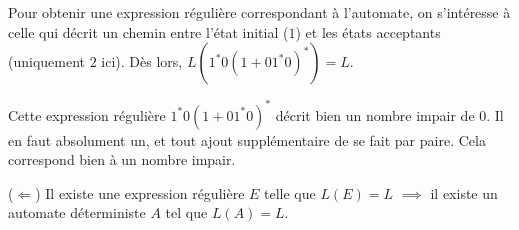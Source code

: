 \begin{exemple}
	Pour obtenir une expression régulière correspondant à l'automate, on s'intéresse à celle qui décrit un chemin entre l'état initial ($1$) et les états acceptants (uniquement $2$ ici). Dès lors,  $L(1^*0(1+01^*0)^*)=L$.
	
	Cette expression régulière $1^*0(1+01^*0)^*$ décrit bien un nombre impair de $0$. Il en faut absolument un, et tout ajout supplémentaire de se fait par paire. Cela correspond bien à un nombre impair.	
	
\end{exemple}


	
\begin{theorem}
	($\Leftarrow$) Il existe une expression régulière $E$ telle que $L(E)=L$ $\implies$  il existe un automate déterministe $A$ tel que $L(A)=L$.
\end{theorem}


